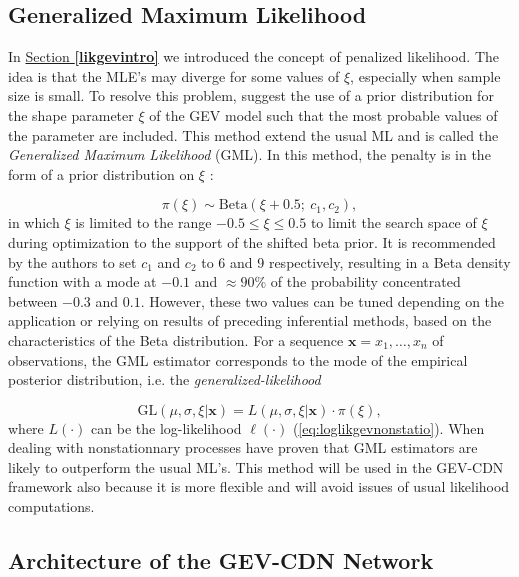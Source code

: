 \subsection{Generalized Maximum Likelihood}


In \hyperref[likgevintro]{Section \textbf{\ref{likgevintro}}} we introduced the concept of penalized likelihood. The idea is that the MLE's may diverge for some values of $\xi$, especially when sample size is small. To resolve this problem, \citet{martins_generalized_2000} suggest the use of a prior distribution for the shape parameter $\xi$ of the GEV model such
that the most probable values of the parameter are included. This method extend the usual ML and is called the \emph{Generalized Maximum Likelihood} (GML). In this method, the penalty is in the form of a prior distribution on $\xi$ : 

\begin{equation}\label{eq:betaprior}
\pi(\xi)\sim\text{Beta}(\xi+0.5 ; \ c_1,c_2),
\end{equation}
in which $\xi$ is limited to the range $-0.5\leq\xi\leq 0.5$ to limit the search space of $\xi$ during optimization to the support of the shifted beta prior. It is recommended by the authors to set $c_1$ and $c_2$ to 6 and 9 respectively, resulting in a Beta density function with a mode at $-0.1$ and $\approx 90\%$ of the probability concentrated between $-0.3$ and $0.1$. However, these two values can be tuned depending on the application or relying on results of preceding inferential methods, based on the characteristics of the Beta distribution. For a sequence $\boldsymbol{x}=x_1,\ldots,x_n$ of observations, the GML estimator corresponds to the mode of the empirical posterior distribution, i.e. the \emph{generalized-likelihood}

\begin{equation}\label{eq:gml}
\text{GL}(\mu, \sigma,\xi|\boldsymbol{x})=L(\mu,\sigma,\xi|\boldsymbol{x})\cdot \pi(\xi),
\end{equation}
where $L(\cdot)$ can be the log-likelihood $\ell(\cdot)$ (\ref{eq:loglikgevnonstatio}).
When dealing with nonstationnary processes \cite{el_adlouni_generalized_2007} have proven that GML estimators are likely to outperform the usual ML's. This method will be used in the GEV-CDN framework also because it is more flexible and will avoid issues of usual likelihood computations.


\subsection{Architecture of the GEV-CDN Network}



